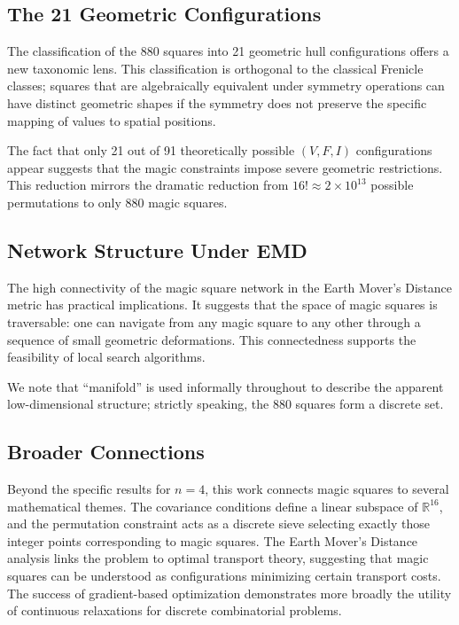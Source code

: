 \subsection{The 21 Geometric Configurations}

The classification of the 880 squares into 21 geometric hull configurations offers a new taxonomic lens. This classification is orthogonal to the classical Frenicle classes; squares that are algebraically equivalent under symmetry operations can have distinct geometric shapes if the symmetry does not preserve the specific mapping of values to spatial positions.

The fact that only 21 out of 91 theoretically possible $(V, F, I)$ configurations appear suggests that the magic constraints impose severe geometric restrictions. This reduction mirrors the dramatic reduction from $16! \approx 2 \times 10^{13}$ possible permutations to only 880 magic squares.

\subsection{Network Structure Under EMD}

The high connectivity of the magic square network in the Earth Mover's Distance metric has practical implications. It suggests that the space of magic squares is traversable: one can navigate from any magic square to any other through a sequence of small geometric deformations. This connectedness supports the feasibility of local search algorithms.

We note that ``manifold'' is used informally throughout to describe the apparent low-dimensional structure; strictly speaking, the 880 squares form a discrete set.

\subsection{Broader Connections}

Beyond the specific results for $n=4$, this work connects magic squares to several mathematical themes. The covariance conditions define a linear subspace of $\mathbb{R}^{16}$, and the permutation constraint acts as a discrete sieve selecting exactly those integer points corresponding to magic squares. The Earth Mover's Distance analysis links the problem to optimal transport theory, suggesting that magic squares can be understood as configurations minimizing certain transport costs. The success of gradient-based optimization demonstrates more broadly the utility of continuous relaxations for discrete combinatorial problems.

